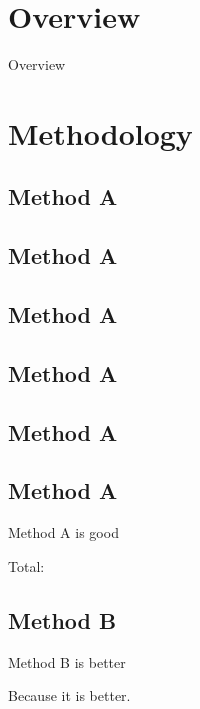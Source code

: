 \documentclass[aspectratio=43]{beamer}
\begin{document}
\section*{Overview}

\begin{frame}{Overview}

\end{frame}

\section{Methodology} %

\subsection{Method A}
    \subsection{Method A}
        \subsection{Method A}
            \subsection{Method A}
                \subsection{Method A}
                    \subsection{Method A}

\begin{frame}{Method A is good}

    Total: \inserttotalframenumber

\end{frame}

\subsection*{Method B}

\begin{frame}{Method B is better}

    Because it is better.

\end{frame}
\end{document}

